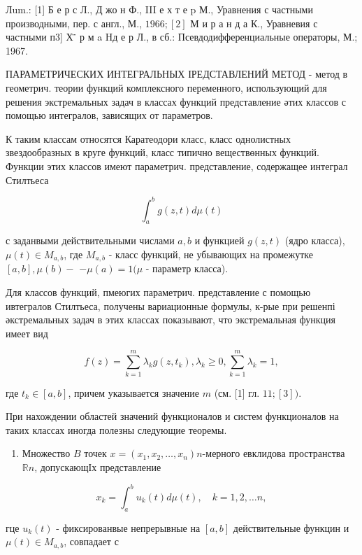 \documentclass[10pt]{article}
\begin{document}
Лum.: [1] Б е р с Л., Д жо н Ф., III е х т е p М., Уравнения с частными производными, пер. с англ., М., $1966 ;[2]$ М и р а н д а К., Уравневия с частными п3] Х ̈̈ р м a Hд е р Л., в сб.: Псевдодифференциальные операторы, М.; 1967.

ПАРАМЕТРИЧЕСКИХ ИНТЕГРАЛЬНЫХ ІРЕДСТАВЛЕНИЙ МЕТОД - метод в геометрич. теории функций комплексного переменного, использующий для решения экстремальных задач в классах функций представление әтих классов с помощью интегралов, зависящих от параметров.

К таким классам относятся Каратеодори класс, класс однолистных звездообразных в круге функций, класс типично веществөнных функций. Функции этих классов имеют параметрич. представление, содержащее интеграл Стилтьеса

\[
\int_{a}^{b} g(z, t) d \mu(t)
\]

с заданвыми действительными числами $a, b$ и функцией $g(z, t)$ (ядро класса), $\mu(t) \in M_{a, b}$, где $M_{a, b}$ - класс функций, не убывающих на промежутке $[a, b], \mu(b)-$ $-\mu(a)=1(\mu$ - параметр класса).

Для классов функций, пмеюгих параметрич. представление с помощью ивтегралов Стилтьеса, получены вариационные формулы, к-рые при решенпі әкстремальных задач в этих классах показывают, что экстремальная функция имеет вид

\[
f(z)=\sum_{k=1}^{m} \lambda_{k} g\left(z, t_{k}\right), \lambda_{k} \geqslant 0, \sum_{k=1}^{m} \lambda_{k}=1,
\]

где $t_{k} \in[a, b]$, причем указывается значение $m$ (см. [1] гл. $11 ;[3])$.

При нахождении областей значений функционалов и систем функционалов на таких классах иногда полезны следующие теоремы.

\begin{enumerate}
  \item Множество $B$ точек $x=\left(x_{1}, x_{2}, \ldots, x_{n}\right) n$-мерного евклидова пространства $\mathbb{R} n$, допускающІх представление
\end{enumerate}

\[
x_{k}=\int_{a}^{b} u_{k}(t) d \mu(t), \quad k=1,2, \ldots n,
\]

гце $u_{k}(t)$ - фиксированвые непрерывные на $[a, b]$ действительные функцин и $\mu(t) \in M_{a, b}$, совпадает с
\end{document}
